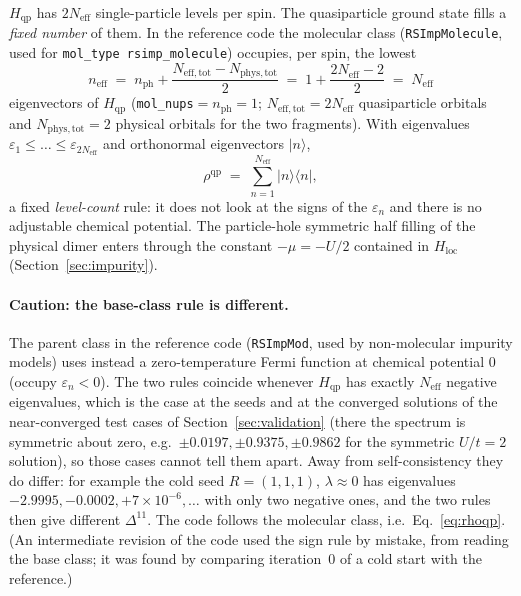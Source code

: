 \documentclass[11pt]{article}
\newcommand{\Neff}{N_{\mathrm{eff}}}
\newcommand{\Hqp}{H_{\mathrm{qp}}}
\newcommand{\Hloc}{H_{\mathrm{loc}}}
\begin{document}
$\Hqp$ has $2\Neff$ single-particle levels per spin. The quasiparticle
ground state fills a \emph{fixed number} of them. In the reference code the
molecular class (\texttt{RSImpMolecule}, used for \texttt{mol\_type
rsimp\_molecule}) occupies, per spin, the lowest
\begin{equation}
  n_{\mathrm{eff}} \;=\; n_{\mathrm{ph}} + \frac{N_{\mathrm{eff,tot}}-N_{\mathrm{phys,tot}}}{2}
  \;=\; 1+\frac{2\Neff-2}{2} \;=\; \Neff
\end{equation}
eigenvectors of $\Hqp$ (\texttt{mol\_nups}$=n_{\mathrm{ph}}=1$; $N_{\mathrm{eff,tot}}=2\Neff$
quasiparticle orbitals and $N_{\mathrm{phys,tot}}=2$ physical orbitals for the
two fragments). With eigenvalues $\varepsilon_1\le\dots\le\varepsilon_{2\Neff}$ and orthonormal
eigenvectors $|n\rangle$,
\begin{equation}
  \rho^{\mathrm{qp}} \;=\; \sum_{n=1}^{\Neff} |n\rangle\langle n| ,
  \label{eq:rhoqp}
\end{equation}
a fixed \emph{level-count} rule: it does not look at the signs of the
$\varepsilon_n$ and there is no adjustable chemical potential.
The particle-hole symmetric half filling of the physical dimer enters through
the constant $-\mu=-U/2$ contained in $\Hloc$ (Section~\ref{sec:impurity}).

\paragraph{Caution: the base-class rule is different.} The parent class in
the reference code (\texttt{RSImpMod}, used by non-molecular impurity models)
uses instead a zero-temperature Fermi function at chemical potential $0$
(occupy $\varepsilon_n<0$). The two rules coincide whenever $\Hqp$ has exactly
$\Neff$ negative eigenvalues, which is the case at the seeds and at the
converged solutions of the near-converged test cases of
Section~\ref{sec:validation} (there the spectrum is symmetric about zero, e.g.\
$\pm0.0197,\pm0.9375,\pm0.9862$ for the symmetric $U/t=2$ solution), so those
cases cannot tell them apart. Away from self-consistency they do differ: for
example the cold seed $R=(1,1,1)$, $\lambda\approx0$ has eigenvalues
$-2.9995,-0.0002,+7\!\times\!10^{-6},\dots$ with only two negative ones, and
the two rules then give different $\Delta^{11}$. The code follows the
molecular class, i.e.\ Eq.~\eqref{eq:rhoqp}. (An intermediate revision of the
code used the sign rule by mistake, from reading the base class; it was found
by comparing iteration~0 of a cold start with the reference.)
\end{document}
